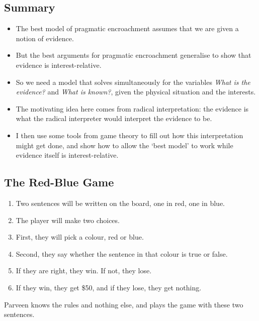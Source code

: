 \def\mytitle{Interests, Evidence and Games}
\def\myauthor{Brian Weatherson}
\def\mydate{July, 2017}
\def\latexmode{Article}


\subsection*{Summary}

\begin{itemize}
\item The best model of pragmatic encroachment assumes that we are given a notion of evidence.
\item But the best arguments for pragmatic encroachment generalise to show that evidence is interest-relative.
\item So we need a model that solves simultaneously for the variables \textit{What is the evidence?} and \textit{What is known?}, given the physical situation and the interests.
\item The motivating idea here comes from radical interpretation: the evidence is what the radical interpreter would interpret the evidence to be.
\item I then use some tools from game theory to fill out how this interpretation might get done, and show how to allow the `best model' to work while evidence itself is interest-relative.
\end{itemize}

\subsection*{The Red-Blue Game}
\begin{enumerate}
\item Two sentences will be written on the board, one in red, one in blue.

\item The player will make two choices.

\item First, they will pick a colour, red or blue.

\item Second, they say whether the sentence in that colour is true or false.

\item If they are right, they win. If not, they lose.

\item If they win, they get \$50, and if they lose, they get nothing.

\end{enumerate}
Parveen knows the rules and nothing else, and plays the game with these two sentences.

